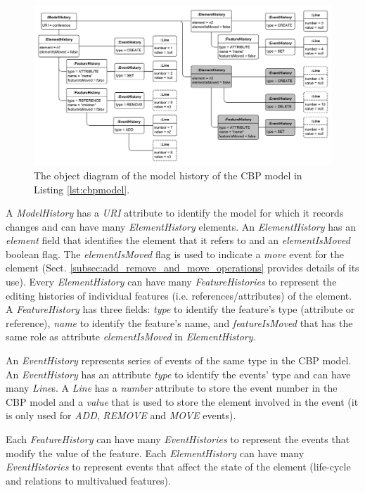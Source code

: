 \documentclass{llncs}
\begin{document}
\begin{figure}[ht]
\centering
\includegraphics[width=\linewidth]{history_structure}
\caption{The object diagram of the model history of the CBP model in Listing \ref{lst:cbpmodel}.}
\label{fig:history_structure}
\end{figure}

A \emph{ModelHistory} has a \emph{URI} attribute to identify the model for which it records changes and can have many \emph{ElementHistory} elements.
An \emph{ElementHistory} has an \emph{element} field that identifies the element that it refers to and an \emph{elementIsMoved} boolean flag. The  \emph{elementIsMoved} flag is used to indicate a \emph{move} event for the element (Sect. \ref{subsec:add_remove_and_move_operations} provides details of its use).
Every \emph{ElementHistory} can have many \emph{FeatureHistories} to represent the editing histories of individual features (i.e. references/attributes) of the element. 
A \emph{FeatureHistory} has three fields: \emph{type} to identify the feature's type (attribute or reference), \emph{name} to identify the feature's name, and \emph{featureIsMoved} that has the same role as attribute \emph{elementIsMoved} in \emph{ElementHistory}.

An \emph{EventHistory} represents series of events of the same type in the CBP model.
An \emph{EventHistory} has an attribute \emph{type} to identify the events' type and can have many \emph{Line}s.
A \emph{Line} has a \emph{number} attribute to store the event number in the CBP model and a \emph{value} that is used to store the element involved in the event (it is only used for \emph{ADD}, \emph{REMOVE} and \emph{MOVE} events).

Each \emph{FeatureHistory} can have many \emph{EventHistories} to represent the events that modify the value of the feature.
Each \emph{ElementHistory} can have many \emph{EventHistories} to represent events that affect the state of the element (life-cycle and relations to multivalued features).
\end{document}
